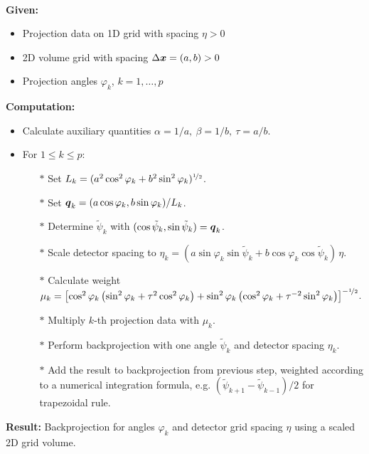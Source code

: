 \documentclass{amsart}
\renewcommand*{\phi}{\varphi}
\begin{document}
\begin{algorithm}~\\[2ex]
 \textbf{Given:}
 \begin{itemize}
  \item Projection data on 1D grid with spacing $\eta > 0$
  \item 2D volume grid with spacing $\Delta{\boldsymbol{x}} = (a, b) > 0$
  \item Projection angles $\phi_k$, $k = 1, \ldots, p$
 \end{itemize}
 \vspace*{2ex}
 \textbf{Computation:}
 \begin{itemize}
  \item Calculate auxiliary quantities $\alpha = 1 / a,\ \beta = 1 / b,\ \tau = a / b$.
  \item For $1 \leq k \leq p$:
  \begin{itemize}
   \item[$\ast$] Set $L_k = (a^2 \cos^2\phi_k + b^2 \sin^2\phi_k)^{\nfhalf}$.
   \item[$\ast$] Set $\Bq_k = (a \cos\phi_k, b \sin\phi_k) / L_k$.
   \item[$\ast$] Determine $\tilde\psi_k$ with $(\cos\tilde\psi_k, \sin\tilde\psi_k) = {\boldsymbol{q}}_k$.
   \item[$\ast$] Scale detector spacing to $\eta_k = (a \sin\phi_k \sin\tilde\psi_k + b \cos\phi_k \cos\tilde\psi_k)\, \eta$.
   \item[$\ast$] Calculate weight $\mu_k = \left[\cos^2\phi_k \left(\sin^2\phi_k + \tau^2 \cos^2\phi_k\right) +
   \sin^2\phi_k \left(\cos^2\phi_k + \tau^{-2} \sin^2\phi_k\right)\right]^{-\nfhalf}$.
   \item[$\ast$] Multiply $k$-th projection data with $\mu_k$.
   \item[$\ast$] Perform backprojection with one angle $\tilde\psi_k$ and detector spacing $\eta_k$.
   \item[$\ast$] Add the result to backprojection from previous step, weighted according to a numerical integration formula, e.g. 
   $(\tilde\psi_{k+1} - \tilde\psi_{k-1}) / 2$ for trapezoidal rule.
  \end{itemize}
 \end{itemize}
 \vspace*{2ex}
 \textbf{Result:} Backprojection for angles $\phi_k$ and detector grid spacing $\eta$ using a scaled 2D grid volume.
\end{algorithm}
\end{document}

